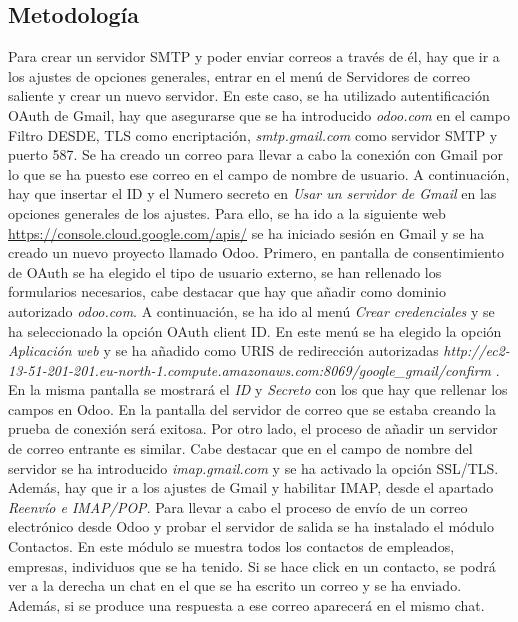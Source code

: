 \subsection{Metodología}
Para crear un servidor SMTP y poder enviar correos a través de él, hay que ir a los ajustes de opciones generales, entrar en el menú de Servidores de correo saliente y crear un nuevo servidor. En este caso, se ha utilizado autentificación OAuth de Gmail, hay que asegurarse que se ha introducido \textit{odoo.com} en el campo Filtro DESDE, TLS como encriptación, \textit{smtp.gmail.com} como servidor SMTP y puerto 587. Se ha creado un correo para llevar a cabo la conexión con Gmail por lo que se ha puesto ese correo en el campo de nombre de usuario. A continuación, hay que insertar el ID y el Numero secreto en \textit{Usar un servidor de Gmail} en las opciones generales de los ajustes. Para ello, se ha ido a la siguiente web \href{https://console.cloud.google.com/apis/}{https://console.cloud.google.com/apis/} se ha iniciado sesión en Gmail y se ha creado un nuevo proyecto llamado Odoo. Primero, en pantalla de consentimiento de OAuth se ha elegido el tipo de usuario externo, se han rellenado los formularios necesarios, cabe destacar que hay que añadir como dominio autorizado \textit{odoo.com}. A continuación, se ha ido al menú \textit{Crear credenciales} y se ha seleccionado la opción OAuth client ID. En este menú se ha elegido la opción \textit{Aplicación web} y se ha añadido como URIS de redirección autorizadas \textit{http://ec2-13-51-201-201.eu-north-1.compute.amazonaws.com:8069/google\_gmail/confirm} . En la misma pantalla se mostrará el \textit{ID} y \textit{Secreto} con los que hay que rellenar los campos en Odoo. En la pantalla del servidor de correo que se estaba creando la prueba de conexión será exitosa. Por otro lado, el proceso de añadir un servidor de correo entrante es similar. Cabe destacar que en el campo de nombre del servidor se ha introducido \textit{imap.gmail.com} y se ha activado la opción SSL/TLS. Además, hay que ir a los ajustes de Gmail y habilitar IMAP, desde el apartado \textit{Reenvío e IMAP/POP}. Para llevar a cabo el proceso de envío de un correo electrónico desde Odoo y probar el servidor de salida se ha instalado el módulo Contactos. En este módulo se muestra todos los contactos de empleados, empresas, individuos que se ha tenido. Si se hace click en un contacto, se podrá ver a la derecha un chat en el que se ha escrito un correo y se ha enviado. Además, si se produce una respuesta a ese correo aparecerá en el mismo chat. 
